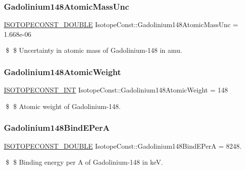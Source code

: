 \subsubsection{\texorpdfstring{Gadolinium148\+Atomic\+Mass\+Unc}{Gadolinium148AtomicMassUnc}}
{\footnotesize\ttfamily \mbox{\hyperlink{group___isotope_const-_macros_ga8f45a7272ce02c0b4c65c44636ed719a}{I\+S\+O\+T\+O\+P\+E\+C\+O\+N\+S\+T\+\_\+\+D\+O\+U\+B\+LE}} Isotope\+Const\+::\+Gadolinium148\+Atomic\+Mass\+Unc = 1.\+668e-\/06}

\$ \$ Uncertainty in atomic mass of Gadolinium-\/148 in amu. \mbox{\label{group___isotope_const-_gadolinium-_gd148_ga82ab890e663f41cde37dcb2d9281f8b8}} 
\subsubsection{\texorpdfstring{Gadolinium148\+Atomic\+Weight}{Gadolinium148AtomicWeight}}
{\footnotesize\ttfamily \mbox{\hyperlink{group___isotope_const-_macros_ga5f18360b3e99483a35c32d789e62621c}{I\+S\+O\+T\+O\+P\+E\+C\+O\+N\+S\+T\+\_\+\+I\+NT}} Isotope\+Const\+::\+Gadolinium148\+Atomic\+Weight = 148}

\$ \$ Atomic weight of Gadolinium-\/148. \mbox{\label{group___isotope_const-_gadolinium-_gd148_gaf20c746860ee48cc1c84a5becf6be339}} 
\subsubsection{\texorpdfstring{Gadolinium148\+Bind\+E\+PerA}{Gadolinium148BindEPerA}}
{\footnotesize\ttfamily \mbox{\hyperlink{group___isotope_const-_macros_ga8f45a7272ce02c0b4c65c44636ed719a}{I\+S\+O\+T\+O\+P\+E\+C\+O\+N\+S\+T\+\_\+\+D\+O\+U\+B\+LE}} Isotope\+Const\+::\+Gadolinium148\+Bind\+E\+PerA = 8248.}

\$ \$ Binding energy per A of Gadolinium-\/148 in keV. \mbox{\label{group___isotope_const-_gadolinium-_gd148_gad9f6fb23449bfa7c504e4f56b101f226}} 
